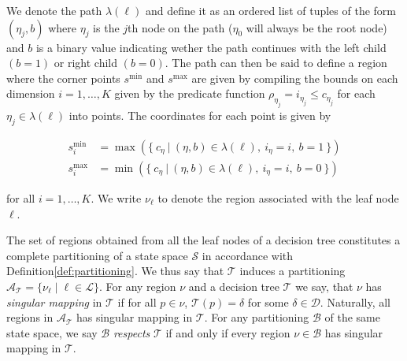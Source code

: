 We denote the path
$\lambda(\ell)$ and define it as an ordered list of tuples of the form
$(\eta_j, b)$ where $\eta_j$ is the $j$th node on the path ($\eta_0$ will always
be the root node) and $b$ is a binary value indicating wether the path continues
with the left child $(b = 1)$ or right child $(b = 0)$.
The path can then be said to define a region where the corner points $s^{\min}$
and $s^{\max}$ are given by compiling the bounds on each dimension $i =
1,\ldots,K$ given by the predicate function $\rho_{\eta_j} = i_{\eta_j} \leq
c_{\eta_j}$ for each $\eta_j \in \lambda(\ell)$ into points. The coordinates for
each point is given by

\begin{align*}
    s^{\min}_i&= \max(\{\>
        c_{\eta}\> |\>
        (\eta, b) \in \lambda(\ell),\>
        i_{\eta} = i, \>
        b = 1\>
    \}) \\
    s^{\max}_i&= \min(\{\>
        c_{\eta}\> |\>
        (\eta, b) \in \lambda(\ell),\>
        i_{\eta} = i,\>
        b = 0\>
    \})
\end{align*}


\noindent
for all $i = 1,\ldots,K$. We write $\nu_{\ell}$ to denote the region associated
with the leaf node $\ell$.

The set of regions obtained from all the leaf nodes of a decision tree
constitutes a complete partitioning of a state space $\mathcal{S}$ in accordance
with Definition\ref{def:partitioning}. We thus say that $\mathcal{T}$ induces a partitioning
$\mathcal{A}_{\mathcal{T}} = \{ \nu_{\ell} \mid \ell \in \mathcal{L} \}$. For
any region $\nu$ and a decision tree $\mathcal{T}$ we say, that $\nu$ has
\textit{singular mapping} in $\mathcal{T}$ if for all $p \in \nu$,
$\mathcal{T}(p) = \delta$ for some $\delta \in \mathcal{D}$. Naturally, all
regions in $\mathcal{A}_{\mathcal{T}}$ has singular mapping in $\mathcal{T}$.
For any partitioning $\mathcal{B}$ of the same state space, we say $\mathcal{B}$
\textit{respects} $\mathcal{T}$ if and only if every region $\nu \in
\mathcal{B}$ has singular mapping in $\mathcal{T}$.

